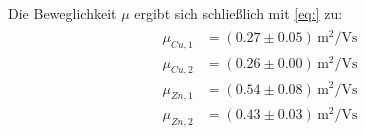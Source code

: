 Die Beweglichkeit $\mu$ ergibt sich schließlich mit \eqref{eq:} zu:
\begin{align}
\begin{aligned}
\mu_{Cu,1} &= (0.27 \pm 0.05) \, \si{\meter^2 \per \volt \second}  \\
\mu_{Cu,2} &= (0.26 \pm 0.00) \, \si{\meter^2 \per \volt \second}  \\
\mu_{Zn,1} &= (0.54 \pm 0.08) \, \si{\meter^2 \per \volt \second}  \\
\mu_{Zn,2} &= (0.43 \pm 0.03) \, \si{\meter^2 \per \volt \second}
\end{aligned}
\end{align}
